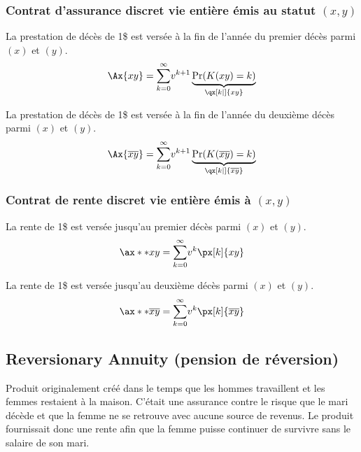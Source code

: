 \documentclass[10pt, french]{article}
\begin{document}
\begin{multicols*}{2}
\subsubsection*{Contrat d'assurance discret vie entière émis au statut $(x, y)$}
La prestation de décès de 1\$ est versée à la fin de l'année du premier décès parmi $(x)$ et $(y)$.
\begin{align*}
	\Ax{xy}
	&=	\sumz{\infty}{k = 0} v^{k + 1} \underbrace{\Pr(K(xy) = k)}_{\qx[k|]{xy}}	\\
\end{align*}

La prestation de décès de 1\$ est versée à la fin de l'année du deuxième décès parmi $(x)$ et $(y)$.
\begin{align*}
	\Ax{\overline{xy}}
	&=	\sumz{\infty}{k = 0} v^{k + 1} \underbrace{\Pr(K(\overline{xy}) = k)}_{\qx[k|]{\overline{xy}}}	\\
\end{align*}


\subsubsection*{Contrat de rente discret vie entière émis à $(x, y)$}
La rente de 1\$ est versée jusqu'au premier décès parmi $(x)$ et $(y)$.
\begin{align*}
	\ax**{xy}
	&=	\sumz{\infty}{k = 0}	v^{k} \px[k]{xy}	\\
\end{align*}

La rente de 1\$ est versée jusqu'au deuxième décès parmi $(x)$ et $(y)$.
\begin{align*}
	\ax**{\overline{xy}}
	&=	\sumz{\infty}{k = 0}	v^{k} \px[k]{\overline{xy}}	\\
\end{align*}

\columnbreak

\subsection{Reversionary Annuity (pension de réversion)}
\begin{rappel_enhanced}[Historique]
Produit originalement créé dans le temps que les hommes travaillent et les femmes restaient à la maison. C'était une assurance contre le risque que le mari décède et que la femme ne se retrouve avec aucune source de revenus. Le produit fournissait donc une rente afin que la femme puisse continuer de survivre sans le salaire de son mari.
\end{rappel_enhanced}


\end{multicols*}
\end{document}
